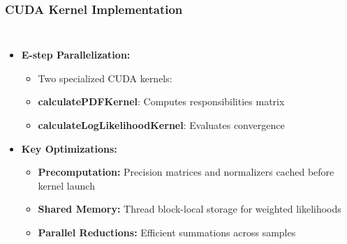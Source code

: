 \documentclass{beamer}
\begin{document}
\begin{frame}
    \frametitle{CUDA Kernel Implementation}
    \begin{columns}
    \begin{itemize}
        \item \textbf{E-step Parallelization:}
        \begin{itemize}
            \item Two specialized CUDA kernels:
            \item \textbf{calculatePDFKernel}: Computes responsibilities matrix
            \item \textbf{calculateLogLikelihoodKernel}: Evaluates convergence
        \end{itemize}
        \item \textbf{Key Optimizations:}
        \begin{itemize}
            \item \textbf{Precomputation:} Precision matrices and normalizers cached before kernel launch
            \item \textbf{Shared Memory:} Thread block-local storage for weighted likelihoods
            \item \textbf{Parallel Reductions:} Efficient summations across samples
        \end{itemize}
    \end{itemize}
    \begin{center}
    \end{center}
    \end{columns}
    
    
\end{frame}
\end{document}
